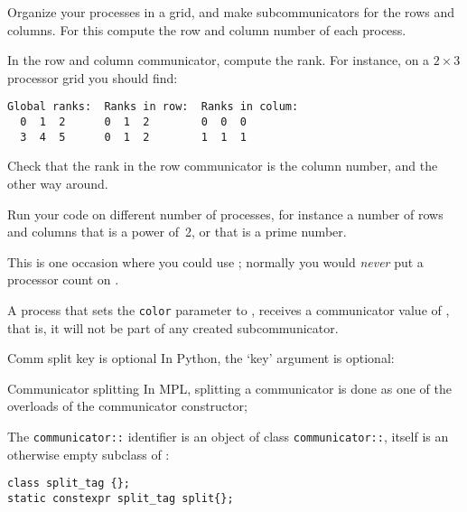 \begin{exercise}
  \label{ex:rowcolcomm}
  Organize your processes in a grid, and make subcommunicators for
  the rows and columns. For this compute the row and column number of
  each process.

  In the row and column communicator, compute the rank. For instance,
  on a $2\times3$ processor grid you should find:
\begin{verbatim}
Global ranks:  Ranks in row:  Ranks in colum:
  0  1  2      0  1  2        0  0  0
  3  4  5      0  1  2        1  1  1
\end{verbatim}

  Check that the rank in the row communicator is the column number,
  and the other way around.

  Run your code on different number of processes, for instance a
  number of rows and columns that is a power of~2, or that is a prime number.
\begin{tacc}
    This is one occasion where you could use ;
    normally you would \emph{never} put a processor count on .
\end{tacc}
\end{exercise}

\begin{remark}
  A process that sets the \lstinline{color} parameter to
  ,
  receives a communicator value of ,
  that is, it will not be part of any created subcommunicator.
\end{remark}

\begin{pythonnote}{Comm split key is optional}
  In Python, the `key' argument is optional:
\end{pythonnote}

\begin{mplnote}{Communicator splitting}
  \label{mpl::split}
  In \ac{MPL}, splitting a communicator is done as one of the overloads
  of the communicator constructor;

  \begin{mplimpl}
    The \lstinline+communicator::+ identifier
    is an object of class
    \lstinline+communicator::+,
    itself is an otherwise empty
    subclass of :
\begin{lstlisting}
class split_tag {};
static constexpr split_tag split{};
\end{lstlisting}
  \end{mplimpl}
\end{mplnote}


